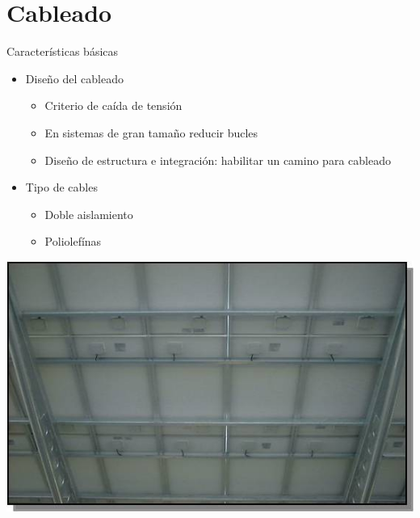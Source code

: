 \documentclass[xcolor={usenames,svgnames,dvipsnames}]{beamer}
\begin{document}
\section{Cableado}
\label{sec:org46adb9d}

\begin{frame}[label={sec:org8573d6c}]{Características básicas}
\begin{itemize}
\item Diseño del cableado

\begin{itemize}
\item Criterio de caída de tensión

\item En sistemas de gran tamaño reducir bucles

\item Diseño de estructura e integración: habilitar un camino para
cableado
\end{itemize}

\item Tipo de cables

\begin{itemize}
\item Doble aislamiento

\item Poliolefínas
\end{itemize}
\end{itemize}
\begin{center}
\includegraphics[height=0.5\textheight]{../figs/PhotocampaCableado.jpg}
\end{center}
\end{frame}
\end{document}
